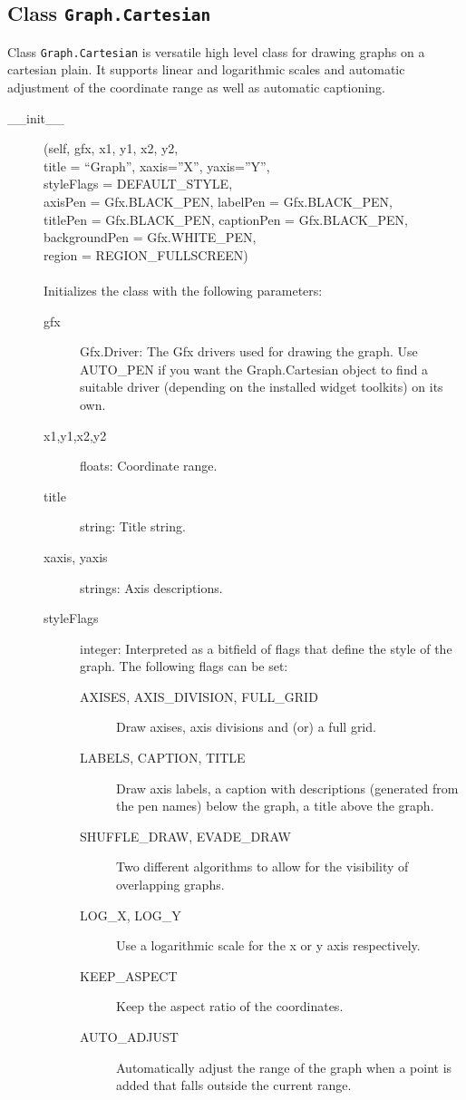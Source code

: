 \documentclass[12pt,a4paper,USenglish]{article}
\begin{document}
\subsection{Class {\tt Graph.Cartesian}} 

Class {\tt Graph.Cartesian} is versatile high level class for drawing
graphs on a cartesian plain. It supports linear and logarithmic scales
and automatic adjustment of the coordinate range as well as automatic
captioning.

\begin{description}

\item[\_\_init\_\_](self, gfx, x1, y1, x2, y2,\\ 
                    title = ``Graph'',  xaxis=''X'', yaxis=''Y'',\\
                    styleFlags = DEFAULT\_STYLE,\\
                    axisPen = Gfx.BLACK\_PEN, labelPen = Gfx.BLACK\_PEN,\\
                    titlePen = Gfx.BLACK\_PEN, captionPen = Gfx.BLACK\_PEN,\\
                    backgroundPen = Gfx.WHITE\_PEN,\\
                    region = REGION\_FULLSCREEN)\\ 
\\Initializes the class with the following parameters:

\begin{description}

\item[gfx] Gfx.Driver: The Gfx drivers used for drawing the graph. Use
AUTO\_PEN if you want the Graph.Cartesian object to find a suitable driver
(depending on the installed widget toolkits) on its own.
\item[x1,y1,x2,y2] floats: Coordinate range.
\item[title] string: Title string.
\item[xaxis, yaxis] strings: Axis descriptions.
\item[styleFlags] integer: Interpreted as a bitfield of flags that
       define the style of the graph. The following flags can be set:

\begin{description}
\item[AXISES, AXIS\_DIVISION, FULL\_GRID] Draw axises, axis divisions 
	and (or) a full grid.
\item[LABELS, CAPTION, TITLE] Draw axis labels, a caption with descriptions 
	(generated from the pen  names) below the graph, a title above 
	the graph.
\item[SHUFFLE\_DRAW, EVADE\_DRAW] Two different algorithms to
	allow for the visibility of overlapping graphs.
\item[LOG\_X, LOG\_Y] Use a logarithmic scale for the x or y axis respectively.
\item[KEEP\_ASPECT] Keep the aspect ratio of the coordinates.
\item[AUTO\_ADJUST] Automatically adjust the range of the graph
        when a point is added that falls outside the current range.
\end{description}
                    

\end{description}
\end{description}
\end{document}
